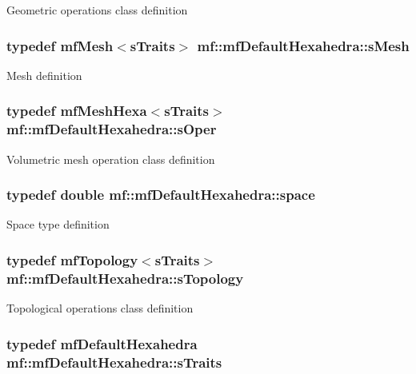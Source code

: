 \label{structmf_1_1mfDefaultHexahedra_a53ee4c731be21fc32670a7c8959febe5}
Geometric operations class definition \hypertarget{structmf_1_1mfDefaultHexahedra_a63486f47d4047cd32e139f19792d00b6}{
\subsubsection[{sMesh}]{\setlength{\rightskip}{0pt plus 5cm}typedef {\bf mfMesh}$<${\bf sTraits}$>$ {\bf mf::mfDefaultHexahedra::sMesh}}}
\label{structmf_1_1mfDefaultHexahedra_a63486f47d4047cd32e139f19792d00b6}
Mesh definition \hypertarget{structmf_1_1mfDefaultHexahedra_a83be74be71b56f14d6041afa586196a2}{
\subsubsection[{sOper}]{\setlength{\rightskip}{0pt plus 5cm}typedef {\bf mfMeshHexa}$<${\bf sTraits}$>$ {\bf mf::mfDefaultHexahedra::sOper}}}
\label{structmf_1_1mfDefaultHexahedra_a83be74be71b56f14d6041afa586196a2}
Volumetric mesh operation class definition \hypertarget{structmf_1_1mfDefaultHexahedra_a54662287a7b444574598fb0d18f027f3}{
\subsubsection[{space}]{\setlength{\rightskip}{0pt plus 5cm}typedef double {\bf mf::mfDefaultHexahedra::space}}}
\label{structmf_1_1mfDefaultHexahedra_a54662287a7b444574598fb0d18f027f3}
Space type definition \hypertarget{structmf_1_1mfDefaultHexahedra_a570a4ce963193f8414eeb0add001d0cb}{
\subsubsection[{sTopology}]{\setlength{\rightskip}{0pt plus 5cm}typedef {\bf mfTopology}$<${\bf sTraits}$>$ {\bf mf::mfDefaultHexahedra::sTopology}}}
\label{structmf_1_1mfDefaultHexahedra_a570a4ce963193f8414eeb0add001d0cb}
Topological operations class definition \hypertarget{structmf_1_1mfDefaultHexahedra_a557747fd5ab6ee8bd28a0f1a3f201473}{
\subsubsection[{sTraits}]{\setlength{\rightskip}{0pt plus 5cm}typedef {\bf mfDefaultHexahedra} {\bf mf::mfDefaultHexahedra::sTraits}}}
